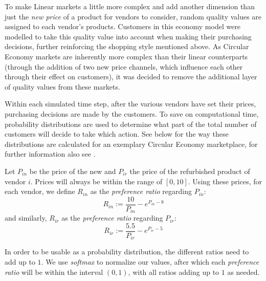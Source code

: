 To make Linear markets a little more complex and add another dimension than just the \emph{new price} of a product for vendors to consider, random quality values are assigned to each vendor's products. Customers in this economy model were modelled to take this quality value into account when making their purchasing decisions, further reinforcing the shopping style mentioned above. As Circular Economy markets are inherently more complex than their linear counterparts (through the addition of two new price channels, which influence each other through their effect on customers), it was decided to remove the additional layer of quality values from these markets.

Within each simulated time step, after the various vendors have set their prices, purchasing decisions are made by the customers. To save on computational time, probability distributions are used to determine what part of the total number of customers will decide to take which action. See below for the way these distributions are calculated for an exemplary Circular Economy marketplace, for further information also see \cite{NickThesis}.

\clearpage
\begin{definition}\label{def:customerDecisions}
	Let \(P_{in}\) be the price of the new and \(P_{ir}\) the price of the refurbished product of vendor \(i\). Prices will always be within the range of \([0,10]\). Using these prices, for each vendor, we define \(R_{in}\) as the \emph{preference ratio} regarding \(P_{in}\):
	\[
		R_{in} := \frac{10}{P_{in}} - e^{P_{in} - 8}
	\]
	and similarly, \(R_{ir}\) as the \emph{preference ratio} regarding \(P_{ir}\):
	\[
		R_{ir} := \frac{5.5}{P_{ir}} - e^{P_{ir} - 5}
	\]
\end{definition}


In order to be usable as a probability distribution, the different ratios need to add up to \(1\). We use \emph{softmax} to normalize our values, after which each \emph{preference ratio} will be within the interval \((0,1)\), with all ratios adding up to \(1\) as needed.

